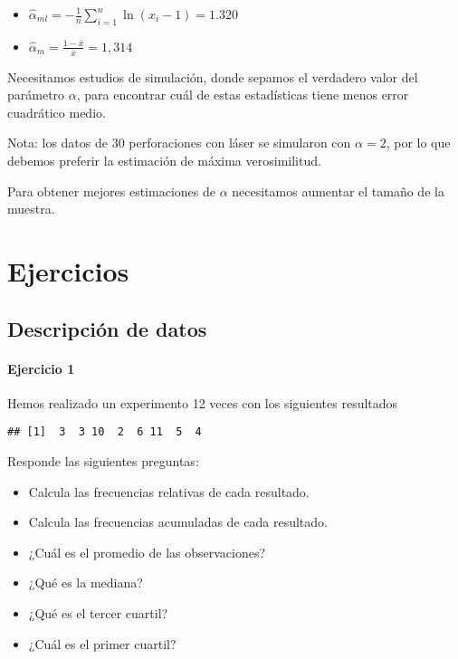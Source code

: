 \documentclass[
]{book}
\providecommand{\tightlist}{%
  \setlength{\itemsep}{0pt}\setlength{\parskip}{0pt}}
\begin{document}
\begin{itemize}
\item
  \(\hat{\alpha}_{ml}=-\frac{1}{n}\sum_{i=1}^n \ln (x_i-1)=1.320\)
\item
  \(\hat{\alpha}_m=\frac{1-\bar{x}}{\bar{x}}=1,314\)
\end{itemize}

Necesitamos estudios de simulación, donde sepamos el verdadero valor del parámetro \(\alpha\), para encontrar cuál de estas estadísticas tiene menos error cuadrático medio.

Nota: los datos de 30 perforaciones con láser se simularon con \(\alpha=2\), por lo que debemos preferir la estimación de máxima verosimilitud.

Para obtener mejores estimaciones de \(\alpha\) necesitamos aumentar el tamaño de la muestra.

\hypertarget{ejercicios}{%
\chapter{Ejercicios}\label{ejercicios}}

\hypertarget{descripciuxf3n-de-datos-1}{%
\section{Descripción de datos}\label{descripciuxf3n-de-datos-1}}

\hypertarget{ejercicio-1}{%
\subsubsection{Ejercicio 1}\label{ejercicio-1}}

Hemos realizado un experimento 12 veces con los siguientes resultados

\begin{verbatim}
## [1]  3  3 10  2  6 11  5  4
\end{verbatim}

Responde las siguientes preguntas:

\begin{itemize}
\tightlist
\item
  Calcula las frecuencias relativas de cada resultado.
\item
  Calcula las frecuencias acumuladas de cada resultado.
\item
  ¿Cuál es el promedio de las observaciones?
\item
  ¿Qué es la mediana?
\item
  ¿Qué es el tercer cuartil?
\item
  ¿Cuál es el primer cuartil?
\end{itemize}
\end{document}
